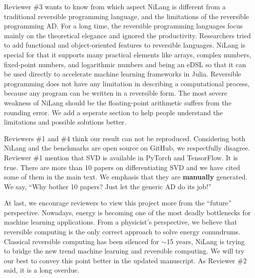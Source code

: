 \documentclass{article}
\begin{document}
Reviewer \#3 wants to know from which aspect NiLang is different from a traditional reversible programming language, and the limitations of the reversible programming AD.
For a long time, the reversible programming languages focus mainly on the theoretical elegance and ignored the productivity. Researchers tried to add functional and object-oriented features to reversible languages.
NiLang is special for that it supports many practical elements like arrays, complex numbers, fixed-point numbers, and logarithmic numbers and being an eDSL so that it can be used directly to accelerate machine learning frameworks in Julia.
Reversible programming does not have any limitation in describing a computational process, because any program can be written in a reversible form. The most severe weakness of NiLang should be the floating-point arithmetic suffers from the rounding error.
We add a seperate section to help people understand the limitations and possible solutions better.

Reviewers \#1 and \#4 think our result can not be reproduced. Considering both NiLang and the benchmarks are open source on GitHub, we respectfully disagree.
Reviewer \#1 mention that SVD is available in PyTorch and TensorFlow. It is true. There are more than 10 papers on differentiating SVD and we have cited some of them in the main text. We emphasis that they are \textbf{manually} generated. We say, ``Why bother 10 papers? Just let the generic AD do its job!''

At last, we encourage reviewers to view this project more from the ``future'' perspective.
Nowadays, energy is becoming one of the most deadly bottlenecks for machine learning applications.
From a physicist's perspective, we believe that reversible computing is the only correct approach to solve energy conundrums.
Classical reversible computing has been silenced for $\sim$15 years, NiLang is trying to bridge the new trend machine learning and reversible computing.
We will try our best to convey this point better in the updated manuscript. As Reviewer \#2 said, it is a long overdue.
\end{document}
